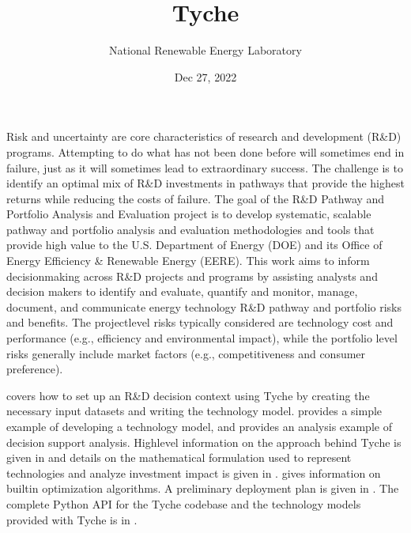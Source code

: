 \documentclass[letterpaper,10pt,english]{sphinxmanual}
\title{Tyche}
\date{Dec 27, 2022}
\author{National Renewable Energy Laboratory}
\begin{document}
\pagestyle{empty}
\sphinxmaketitle
\pagestyle{plain}
\sphinxtableofcontents
\pagestyle{normal}
\label{\detokenize{index::doc}}


\sphinxAtStartPar
Risk and uncertainty are core characteristics of research and development (R\&D) programs. Attempting to do what has not been done before will sometimes end in failure, just as it will sometimes lead to extraordinary success. The challenge is to identify an optimal mix of R\&D investments in pathways that provide the highest returns while reducing the costs of failure. The goal of the R\&D Pathway and Portfolio Analysis and Evaluation project is to develop systematic, scalable pathway and portfolio analysis and evaluation methodologies and tools that provide high value to the U.S. Department of Energy (DOE) and its Office of Energy Efficiency \& Renewable Energy (EERE). This work aims to inform decision\sphinxhyphen{}making across R\&D projects and programs by assisting analysts and decision makers to identify and evaluate, quantify and monitor, manage, document, and communicate energy technology R\&D pathway and portfolio risks and benefits. The project\sphinxhyphen{}level risks typically considered are technology cost and performance (e.g., efficiency and environmental impact), while the portfolio level risks generally include market factors (e.g., competitiveness and consumer preference).

\sphinxAtStartPar
{\hyperref[\detokenize{cheat-sheet:sec-quickstart}]{}} covers how to set up an R\&D decision context using Tyche by creating the necessary input datasets and writing the technology model. {\hyperref[\detokenize{example-technology:sec-techmodelexample}]{}} provides a simple example of developing a technology model, and {\hyperref[\detokenize{example-analysis:sec-analysisexample}]{}} provides an analysis example of decision support analysis. High\sphinxhyphen{}level information on the approach behind Tyche is given in {\hyperref[\detokenize{approach:sec-approach}]{}} and details on the mathematical formulation used to represent technologies and analyze investment impact is given in {\hyperref[\detokenize{formulation:sec-formulation}]{}}. {\hyperref[\detokenize{optimizers:sec-optimizers}]{}} gives information on built\sphinxhyphen{}in optimization algorithms. A preliminary deployment plan is given in {\hyperref[\detokenize{deployment:sec-deployment}]{}}. The complete Python API for the Tyche codebase and the technology models provided with Tyche is in {\hyperref[\detokenize{modules:sec-modules}]{}}.
\end{document}
